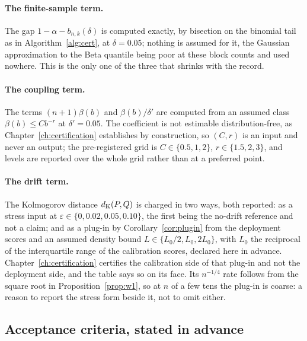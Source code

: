 \documentclass[../../../main.tex]{subfiles}
\begin{document}
\paragraph{The finite-sample term.} The gap $1-\alpha-b_{n,k}(\delta)$ is computed exactly, by bisection on the binomial tail as in Algorithm~\ref{alg:cert}, at $\delta=0.05$; nothing is assumed for it, the Gaussian approximation to the Beta quantile being poor at these block counts and used nowhere. This is the only one of the three that shrinks with the record.

\paragraph{The coupling term.} The terms $(n+1)\beta(b)$ and $\beta(b)/\delta'$ are computed from an assumed class $\beta(b)\le Cb^{-r}$ at $\delta'=0.05$. The coefficient is not estimable distribution-free, as Chapter~\ref{ch:certification} establishes by construction, so $(C,r)$ is an input and never an output; the pre-registered grid is $C\in\{0.5,1,2\}$, $r\in\{1.5,2,3\}$, and levels are reported over the whole grid rather than at a preferred point.

\paragraph{The drift term.} The Kolmogorov distance $d_{\mathrm{K}}(P,Q)$ is charged in two ways, both reported: as a stress input at $\varepsilon\in\{0,0.02,0.05,0.10\}$, the first being the no-drift reference and not a claim; and as a plug-in by Corollary~\ref{cor:plugin} from the deployment scores and an assumed density bound $L\in\{L_0/2,L_0,2L_0\}$, with $L_0$ the reciprocal of the interquartile range of the calibration scores, declared here in advance. Chapter~\ref{ch:certification} certifies the calibration side of that plug-in and not the deployment side, and the table says so on its face. Its $n^{-1/4}$ rate follows from the square root in Proposition~\ref{prop:w1}, so at $n$ of a few tens the plug-in is coarse: a reason to report the stress form beside it, not to omit either.

\subsection{Acceptance criteria, stated in advance}
\end{document}
